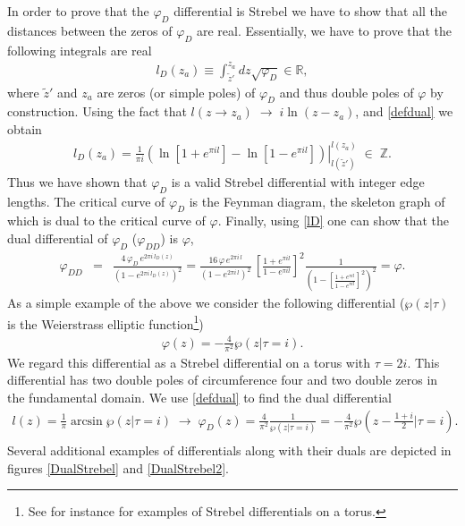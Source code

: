 \documentclass[11pt]{JHEP3}
\def\be{\begin{eqnarray}}
\def\ee{\end{eqnarray}}
\def\vf{\varphi}
\begin{document}
In order to prove that the $\vf_D$ differential is Strebel we have to show that
all the distances between the zeros of $\vf_D$ are real. Essentially, we have to prove that
the following integrals are real
\be
l_D(z_a)\equiv\int_{\tilde z'}^{z_a}dz\sqrt{\vf_D}\in {\mathbb R},
\ee where $\tilde z'$ and $z_a$ are zeros (or simple poles) of $\vf_D$ and thus double poles
of $\vf$ by construction.  
 Using the fact that $l(z\to z_a)\;\to\;i\ln (z-z_a)$, and  \eqref{defdual} we obtain
\be\label{lD}
l_D(z_a)=\frac{1}{\pi i}\left.\left(\ln \left[1+e^{\pi i l}\right]-\ln \left[1-e^{\pi i l}\right]\right)\right|_{l(\tilde z')}^{l(z_a)}
\;\in\;{\mathbb Z}.
\ee 
Thus we have shown that $\vf_D$ is a valid Strebel differential with integer edge lengths. The 
critical curve of $\vf_D$ is the Feynman diagram, the skeleton graph of which
is dual to the critical curve of $\vf$.
Finally, using \eqref{lD} one can  show that the dual differential of $\vf_D$ ($\vf_{DD}$) is $\vf$,
\be
\vf_{DD}&=&\frac{4\,\vf_D\,e^{2\pi i\,l_D(z)}}{\left(1-e^{2\pi i\,l_D(z)}\right)^2}=
\frac{16\,\vf\,e^{2\pi i\,l}}{\left(1-e^{2\pi i\,l}\right)^2}\,
\left[\frac{1+e^{\pi i l}}{1-e^{\pi i l}}\right]^2\frac{1}{\left(1-\left[\frac{1+e^{\pi i l}}{1-e^{\pi i l}}\right]^2\right)^2}=\vf.
\ee As a simple example of the above we consider the following differential ($\wp(z|\tau)$ is the Weierstrass elliptic function\footnote{
See for instance \cite{Aharony:2006th} for examples of Strebel differentials on a torus.})
\be
\vf(z)=-\frac{4}{\pi^2}\wp(z|\tau=i).
\ee We regard this differential as a Strebel differential on a torus with $\tau=2i$. This differential has two double poles of circumference
four and two double zeros in the fundamental domain. We use \eqref{defdual} to find the dual differential 
\be
l(z)=\frac{1}{\pi}\arcsin\wp(z|\tau=i)\;\to\; \vf_D(z)=\frac{4}{\pi^2}\frac{1}{\wp(z|\tau=i)}=-\frac{4}{\pi^2}\wp(z-\frac{1+i}{2}|\tau=i).\nonumber\\
\ee 
Several additional examples of differentials along with their duals are depicted in figures \ref{DualStrebel} and \ref{DualStrebel2}.
\end{document}

